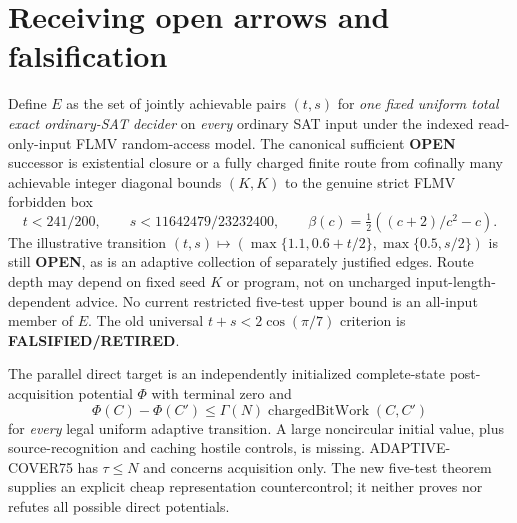 \documentclass[11pt]{article}
\begin{document}
\section{Receiving open arrows and falsification}
Define $E$ as the set of jointly achievable pairs $(t,s)$ for \emph{one fixed uniform total exact ordinary-SAT decider} on \emph{every} ordinary SAT input under the indexed read-only-input FLMV random-access model. The canonical sufficient \textbf{OPEN} successor is existential closure or a fully charged finite route from cofinally many achievable integer diagonal bounds $(K,K)$ to the genuine strict FLMV forbidden box
\[
t<241/200,\qquad s<11642479/23232400,
\qquad \beta(c)=\tfrac12((c+2)/c^2-c).
\]
The illustrative transition $(t,s)\mapsto(\max\{1.1,0.6+t/2\},\max\{0.5,s/2\})$ is still \textbf{OPEN}, as is an adaptive collection of separately justified edges. Route depth may depend on fixed seed $K$ or program, not on uncharged input-length-dependent advice. No current restricted five-test upper bound is an all-input member of $E$. The old universal $t+s<2\cos(\pi/7)$ criterion is \textbf{FALSIFIED/RETIRED}.

The parallel direct target is an independently initialized complete-state post-acquisition potential $\Phi$ with terminal zero and
\[
\Phi(C)-\Phi(C')\le\Gamma(N)\operatorname{chargedBitWork}(C,C')
\]
for \emph{every} legal uniform adaptive transition. A large noncircular initial value, plus source-recognition and caching hostile controls, is missing. ADAPTIVE-COVER75 has $\tau\le N$ and concerns acquisition only. The new five-test theorem supplies an explicit cheap representation countercontrol; it neither proves nor refutes all possible direct potentials.
\end{document}
